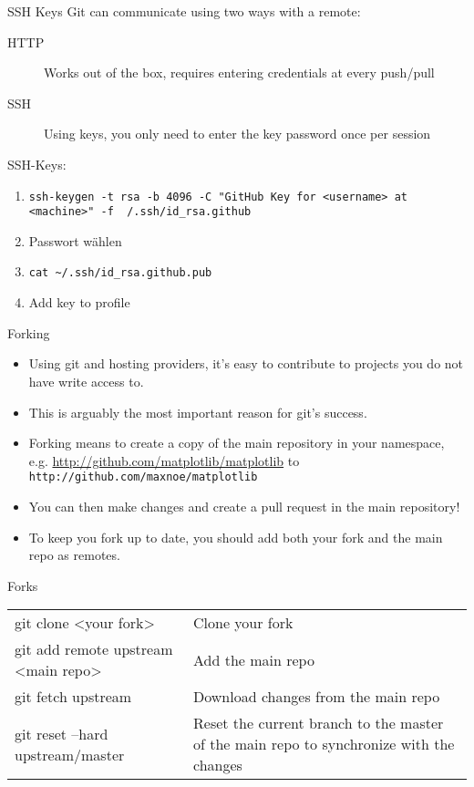 \begin{frame}{SSH Keys}
  Git can communicate using two ways with a remote:
  \begin{description}
    \item[HTTP] Works out of the box, requires entering credentials at every push/pull
    \item[SSH] Using keys, you only need to enter the key password once per session
  \end{description}

  SSH-Keys:
  \begin{enumerate}
    \item \texttt{ssh-keygen -t rsa -b 4096 -C "GitHub Key for <username> at <machine>" -f ~/.ssh/id\_rsa.github}
    \item Passwort wählen
    \item \texttt{cat \textasciitilde/.ssh/id\_rsa.github.pub}
    \item Add key to profile
  \end{enumerate}
\end{frame}


\begin{frame}[t]{Forking}
  \begin{itemize}
    \item Using git and hosting providers, it's easy to contribute to projects you do not have write access to.

    \item This is arguably the most important reason for git's success.

    \item Forking means to create a copy of the main repository in your namespace, e.g. \url{http://github.com/matplotlib/matplotlib} to \texttt{http://github.com/maxnoe/matplotlib}

    \item You can then make changes and create a pull request in the main repository!

    \item To keep you fork up to date, you should add both your fork and the main repo as remotes.
  \end{itemize}
\end{frame}

\begin{frame}{Forks}
  \begin{tabu}{>{\ttfamily}l X[,L]}
    git clone <your fork>  & Clone your fork \\
    git add remote upstream <main repo>   & Add the main repo \\
    git fetch upstream   & Download changes from the main repo \\
    git reset --hard upstream/master & Reset the current branch to the master of the main repo to synchronize with the changes
  \end{tabu}
\end{frame}

